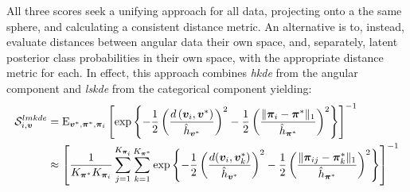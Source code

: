 All three scores seek a unifying approach for all data, projecting onto a the same 
sphere, and calculating a 
    consistent distance metric.  An alternative is to, instead, evaluate distances 
    between angular data their own space, and, separately, latent posterior class 
    probabilities in their own space, with the appropriate distance metric for 
    each.  In effect, this approach combines \emph{hkde} from
    the angular component and \emph{lskde} from the categorical component yielding:
    \begin{equation}
    \label{eqn:lmkdecat}
    \begin{aligned}
    \mathcal{S}_{i,\bm{v}}^{lmkde} &= \text{E}_{\bm{v}^*,\bm{\pi}^*,\bm{\pi}_i}\left[
        \exp
        \left\lbrace 
        -\frac{1}{2}
        \left(
        \frac{d\left(\bm{v}_i, \bm{v}^*\right)}{\hat{h}_{\bm{v}^*}}
        \right)^2
        -\frac{1}{2}
        \left(
        \frac{\lVert\bm{\pi}_i - \bm{\pi}^*\rVert_1}{\hat{h}_{\bm{\pi}^*}}
        \right)^2
        \right\rbrace
        \right]^{-1}\\
        &\approx \left[\frac{1}{K_{\bm{\pi}^*}K_{\bm{\pi}_i}}
            \sum_{j = 1}^{K_{\bm{\pi}_i}}\sum_{k=1}^{K_{\bm{\pi}^*}}
            \exp\left\lbrace-\frac{1}{2}
            \left(\frac{d(\bm{v}_i,\bm{v}_k^*)}{\hat{h}_{\bm{v}^*}}\right)^2
            -\frac{1}{2}\left(
            \frac{\lVert\bm{\pi}_{ij} - \bm{\pi}_k^*\rVert_1}{\hat{h}_{\bm{\pi}^*}}
            \right)^2
            \right\rbrace\right]^{-1}
    \end{aligned}
    \end{equation}
